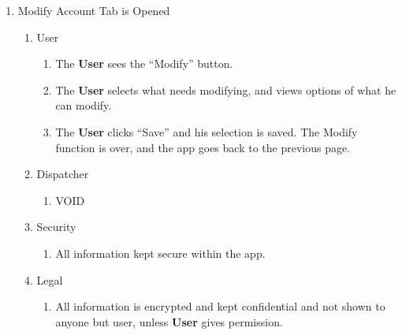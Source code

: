 \documentclass[english]{article}
\begin{document}
\begin{enumerate}[{BE}1.]
	\item Modify Account Tab is Opened	
	\begin{enumerate}[{VP4}.1]
		\item User
			\begin{enumerate}
				\item The \textbf{User} sees the “Modify” button.
				\item The \textbf{User} selects what needs modifying, and views options of what he can modify.
				\item The \textbf{User} clicks “Save” and his selection is saved. The Modify function is over, and the app goes back to the previous page.
			\end{enumerate}
		\item Dispatcher
			\begin{enumerate}
				\item VOID
			\end{enumerate}
		\item Security
			\begin{enumerate}
				\item All information kept secure within the app.
			\end{enumerate}
		\item Legal
			\begin{enumerate}
				\item All information is encrypted and kept confidential and not shown to anyone but user, unless \textbf{User} gives permission.
			\end{enumerate}
	\end{enumerate}


\end{enumerate}
\end{document}
